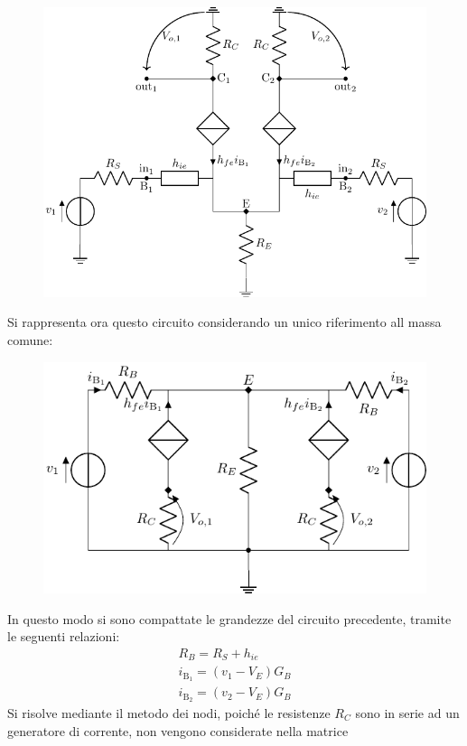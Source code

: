 \documentclass{article}
\numberwithin{equation}{subsection}
\begin{document}
\begin{figure}[H]%
    \centering
    \includegraphics{amplificatore-differenziale-parametri-ibridi.pdf}%
\end{figure}
Si rappresenta ora questo circuito considerando un unico riferimento all massa comune:
\begin{figure}[H]%
    \centering
    \includegraphics{amplificatore-differenziale-modello-h.pdf}%
\end{figure}
In questo modo si sono compattate le grandezze del circuito precedente, tramite le seguenti relazioni:
\begin{gather*}
    R_B=R_S+h_{ie}\\
    i_{\mathrm{B_1}}=(v_1-V_{E})G_B\\
    i_{\mathrm{B_2}}=(v_2-V_{E})G_B
\end{gather*}
Si risolve mediante il metodo dei nodi, poiché le resistenze $R_C$ sono in serie ad un generatore di corrente, non vengono considerate nella matrice 
\end{document}
